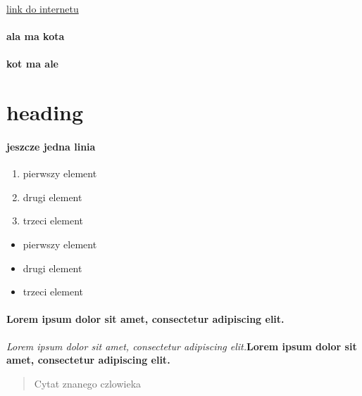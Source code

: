 \documentclass{article}
\begin{document}
\href{http://www.overleaf.com}{link do internetu}
\paragraph{ala ma kota}
\paragraph{kot ma ale}
\section{heading}
\paragraph{jeszcze jedna linia}
\begin{enumerate}
\item pierwszy element
\item drugi element
\item trzeci element
\end{enumerate}
\begin{itemize}
\item pierwszy element
\item drugi element
\item trzeci element
\end{itemize}
\paragraph{Lorem ipsum dolor sit amet, consectetur adipiscing elit.}
\textit{Lorem ipsum dolor sit amet, consectetur adipiscing elit.}\textbf{Lorem ipsum dolor sit amet, consectetur adipiscing elit.}\begin{quote}Cytat znanego czlowieka\end{quote}
\end{document}
